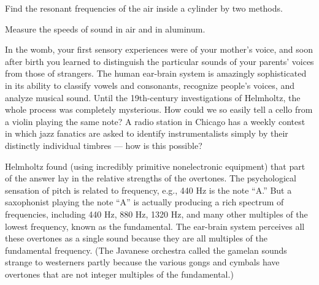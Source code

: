 \label{lab:resonances-of-sound}

\apparatus
{}

\begin{goals}

\item[] Find the resonant frequencies of the air inside a
cylinder by two methods.

\item[] Measure the speeds of sound in air and in aluminum.
\end{goals}

\introduction

In the womb, your first sensory experiences were of your
mother's voice, and soon after birth you learned to
distinguish the particular sounds of your parents' voices
from those of strangers.  The human ear-brain system is
amazingly sophisticated in its ability to classify vowels
and consonants, recognize people's voices, and analyze
musical sound.  Until the 19th-century investigations of
Helmholtz, the whole process was completely mysterious.  How
could we so easily tell a cello from a violin playing the
same note?  A radio station in Chicago has a weekly contest
in which jazz fanatics are asked to identify instrumentalists
simply by their distinctly individual timbres --- how is this possible?

Helmholtz found (using incredibly primitive nonelectronic
equipment) that part of the answer lay in the relative
strengths of the overtones.  The psychological sensation of
pitch is related to frequency, e.g., 440 Hz is the note
``A.''  But a saxophonist playing the note ``A'' is actually
producing a rich spectrum of frequencies, including 440 Hz,
880 Hz, 1320 Hz, and many other multiples of the lowest
frequency, known as the fundamental.  The ear-brain system
perceives all these overtones as a single sound because they
are all multiples of the fundamental frequency.  (The
Javanese orchestra called the gamelan sounds strange to
westerners partly because the various gongs and cymbals have
overtones that are not integer multiples of the fundamental.)

